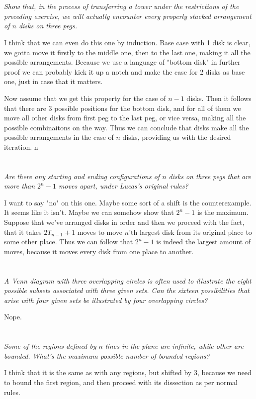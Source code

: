 \documentclass[11pt,oneside,titlepage]{book}
\begin{document}
\section{}

\textit{Show that, in the process of transferring a tower under the restrictions of the preceding
  exercise, we will actually encounter every properly stacked arrangement of $n$ disks
  on three pegs.}

I think that we can even do this one by induction. Base case with 1 disk is clear, we gotta
move it firstly to the middle one, then to the last one, making it all the possible arrangements.
Because we use a language of "bottom disk" in further proof we can probably kick it up a notch
and make the case for 2 disks as base one, just in case that it matters.

Now assume that we get this property for the case of $n - 1$ disks. Then it follows that
there are 3 possible positions for the bottom disk, and for all of them we move all other disks
from first peg to the last peg, or vice versa, making all the possible combinaitons on the way.
Thus we can conclude that disks make all the possible arrangements in the case of $n$ disks,
providing us with the desired iteration.
n
\section{}

\textit{Are there any starting and ending configurations of $n$ disks on three pegs that
  are more than $2^n - 1$ moves apart, under Lucas's original rules?}

I want to say "no" on this one. Maybe some sort of a shift is the counterexample. It seems
like it isn't. Maybe we can somehow show that $2^n - 1$ is the  maximum.
Suppose that we've arranged
disks in order and then we proceed with the fact, that it takes $2T_{n - 1} + 1$ moves to move
$n$'th largest disk from its original place to some other place. Thus we can follow that
$2^n - 1$ is indeed the largest amount of moves, because it moves every disk from one
place to another.

\section{}

\textit{A Venn diagram with three overlapping circles is often used to illustrate the eight
  possible subsets associated with three given sets. Can the sixteen possibilities that arise
  with four given sets be illustrated by four overlapping circles?}

Nope. 

\section{}

\textit{Some of the regions defined by $n$ lines in the plane are infinite, while other are
  bounded. What's the maximum possible number of bounded regions?}

I think that it is the same as with any regions, but shifted by 3, because we need to bound the
first region, and then proceed with its dissection as per normal rules.
\end{document}
